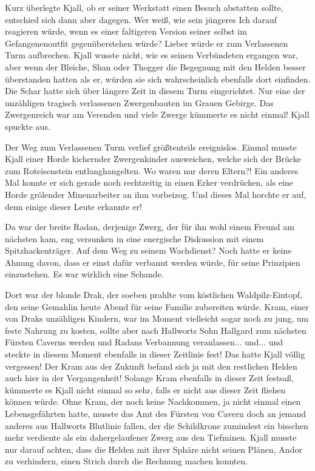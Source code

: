 Kurz überlegte Kjall, ob er seiner Werkstatt einen Besuch abstatten sollte, entschied sich dann aber dagegen. Wer weiß, wie sein jüngeres Ich darauf reagieren würde, wenn es einer faltigeren Version seiner selbst im Gefangenenoutfit gegenüberstehen würde? Lieber würde er zum Verlassenen Turm aufbrechen. Kjall wusste nicht, wie es seinen Verbündeten ergangen war, aber wenn der Bleiche, Shan oder Thogger die Begegnung mit den Helden besser überstanden hatten als er, würden sie sich wahrscheinlich ebenfalls dort einfinden. Die Schar hatte sich über längere Zeit in diesem Turm eingerichtet. Nur eine der unzähligen tragisch verlassenen Zwergenbauten im Grauen Gebirge. Das Zwergenreich war am Verenden und viele Zwerge kümmerte es nicht einmal! Kjall spuckte aus.



\trennzeichen



Der Weg zum Verlassenen Turm verlief größtenteils ereignislos. Einmal musste Kjall einer Horde kichernder Zwergenkinder ausweichen, welche sich der Brücke zum Roteisenstein entlanghangelten. Wo waren nur deren Eltern?! Ein anderes Mal konnte er sich gerade noch rechtzeitig in einen Erker verdrücken, als eine Horde grölender Minenarbeiter an ihm vorbeizog. Und dieses Mal horchte er auf, denn einige dieser Leute erkannte er!

Da war der breite Radan, derjenige Zwerg, der für ihn wohl einem Freund am nächsten kam, eng versunken in eine energische Diskussion mit einem Spitzhackenträger. Auf dem Weg zu seinem Wachdienst? Noch hatte er keine Ahnung davon, dass er einst dafür verbannt werden würde, für seine Prinzipien einzustehen. Es war wirklich eine Schande.

Dort war der blonde Drak, der soeben prahlte vom köstlichen Waldpilz-Eintopf, den seine Gemahlin heute Abend für seine Familie zubereiten würde. Kram, einer von Draks unzähligen Kindern, war im Moment vielleicht sogar noch zu jung, um feste Nahrung zu kosten, sollte aber nach Hallworts Sohn Hallgard zum nächsten Fürsten Caverns werden und Radans Verbannung veranlassen... und... und steckte in diesem Moment ebenfalls in dieser Zeitlinie fest! Das hatte Kjall völlig vergessen! Der Kram aus der Zukunft befand sich ja mit den restlichen Helden auch hier in der Vergangenheit! Solange Kram ebenfalls in dieser Zeit festsaß, kümmerte es Kjall nicht einmal so sehr, falls er nicht aus dieser Zeit fliehen können würde. Ohne Kram, der noch keine Nachkommen, ja nicht einmal einen Lebensgefährten hatte, musste das Amt des Fürsten von Cavern doch an jemand anderes aus Hallworts Blutlinie fallen, der die Schildkrone zumindest ein bisschen mehr verdiente als ein dahergelaufener Zwerg aus den Tiefminen. Kjall musste nur darauf achten, dass die Helden mit ihrer Sphäre nicht seinen Plänen, Andor zu verhindern, einen Strich durch die Rechnung machen konnten.


